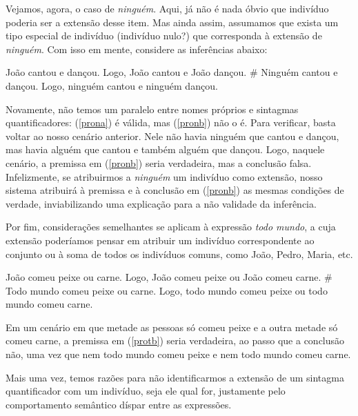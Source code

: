 Vejamos, agora, o caso de \textit{ninguém}. Aqui, já não é nada óbvio que
indivíduo poderia ser a extensão desse item. Mas ainda assim,
assumamos que exista um tipo especial de indivíduo (indivíduo
nulo?) que corresponda à extensão de \textit{ninguém}. Com isso em mente,
considere as inferências abaixo:

\begin{exe}
\ex\label{pron}
\begin{xlist}
\ex João cantou e dançou. Logo, João cantou e João dançou.\label{prona}
\ex \# Ninguém cantou e dançou. Logo, ninguém cantou e ninguém dançou.\label{pronb}
\end{xlist}
\end{exe}

\n Novamente, não temos um paralelo entre nomes próprios e
sintagmas quantificadores: (\ref{prona}) é válida, mas
(\ref{pronb}) não o é. Para verificar, basta voltar ao nosso
cenário anterior. Nele não havia ninguém que cantou e dançou, mas
havia alguém que cantou e também alguém que dançou. Logo, naquele
cenário, a premissa em (\ref{pronb}) seria verdadeira, mas a
conclusão falsa. Infelizmente, se atribuirmos a \textit{ninguém} um
indivíduo como extensão, nosso sistema atribuirá à premissa e à
conclusão em (\ref{pronb}) as mesmas condições de verdade,
inviabilizando uma explicação para a não validade da
inferência.

Por fim, considerações semelhantes se aplicam à expressão \textit{todo
mundo}, a cuja extensão poderíamos pensar em atribuir um indivíduo
correspondente ao conjunto ou à soma de todos os indivíduos
comuns, como João, Pedro, Maria, etc.

\begin{exe}
\ex\label{prot}
\begin{xlist}
\ex João comeu peixe ou carne. Logo, João comeu peixe ou João comeu carne.\label{prota}
\ex \# Todo mundo comeu peixe ou carne. Logo, todo mundo comeu peixe ou todo mundo comeu carne.\label{protb}
\end{xlist}
\end{exe}

\n Em um cenário em que metade as pessoas só comeu peixe e a outra metade só comeu carne, a premissa em (\ref{protb}) seria verdadeira, ao passo que a conclusão não, uma vez que nem todo mundo comeu peixe e nem todo mundo comeu carne.

Mais uma vez, temos razões para não identificarmos a extensão de
um sintagma quantificador com um indivíduo, seja ele qual for, justamente pelo comportamento semântico díspar entre as expressões.

